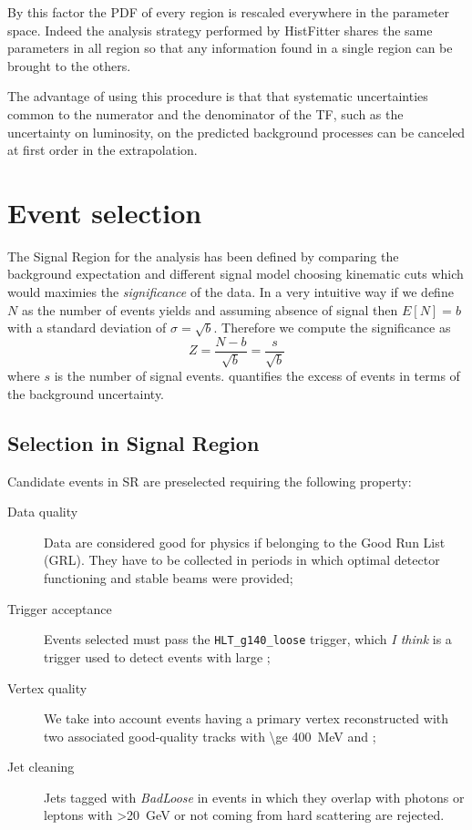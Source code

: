 By this factor the PDF of every region is rescaled everywhere in the parameter space. Indeed the analysis strategy performed by HistFitter shares the same parameters in all region so that any information found in a single region can be brought to the others.

The advantage of using this procedure is that that systematic uncertainties common to the numerator and the denominator of the TF, such as the uncertainty on luminosity, on the predicted background processes can be canceled at first order in the extrapolation.

\section{Event selection}
The Signal Region for the \mph analysis has been defined by comparing the background expectation and different signal model choosing kinematic cuts which would maximies the \emph{significance} of the data. In a very intuitive way if we define $N$ as the number of events yields and assuming absence of signal then $E[N]=b$ with a standard deviation of $\sigma = \sqrt{b}$. Therefore we compute the significance as
\begin{equation}
  Z=\frac{N-b}{\sqrt{b}}=\frac{s}{\sqrt{b}}
  \label{eqn:significance}
\end{equation}
where $s$ is the number of signal events. \Eqn{\ref{eqn:significance}} quantifies the excess of events in terms of the background uncertainty.

\subsection{Selection in Signal Region}
Candidate events in SR are preselected requiring the following property:
\begin{description}
\item [Data quality] Data are considered good for physics if belonging to the Good Run List (GRL). They have to be collected in periods in which optimal detector functioning and stable beams were provided;
\item [Trigger acceptance] Events selected must pass the  \verb!HLT_g140_loose! trigger, which {\itshape I think} is a trigger used to detect events with large \met; 
\item [Vertex quality] We take into account events having a primary vertex reconstructed with two associated good-quality tracks with \pt \SI{\ge 400}{\MeV} and ;
\item [Jet cleaning] Jets tagged with {\itshape BadLoose}  in events in which they overlap with photons or leptons with \pt \SI{>20}{\GeV} or not coming from hard scattering are rejected.
\end{description}

